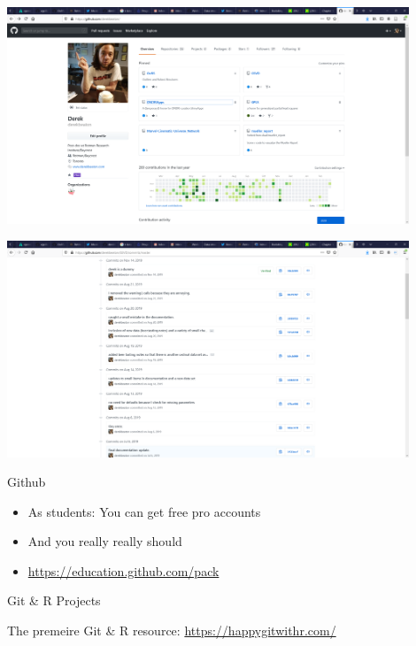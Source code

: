 \documentclass[
  ignorenonframetext,
]{beamer}
\providecommand{\tightlist}{%
  \setlength{\itemsep}{0pt}\setlength{\parskip}{0pt}}
\begin{document}
\begin{frame}

\includegraphics[width=0.9\textwidth,height=\textheight]{../external/images/DB_GIT.PNG}

\end{frame}

\begin{frame}

\includegraphics[width=0.9\textwidth,height=\textheight]{../external/images/DB_GSVD_History.PNG}

\end{frame}

\begin{frame}{Github}
\protect\hypertarget{github}{}

\begin{itemize}[<+->]
\tightlist
\item
  As students: You can get free pro accounts
\item
  And you really really should
\item
  \url{https://education.github.com/pack}
\end{itemize}

\end{frame}

\begin{frame}{Git \& R Projects}
\protect\hypertarget{git-r-projects}{}

The premeire Git \& R resource: \url{https://happygitwithr.com/}

\end{frame}
\end{document}

